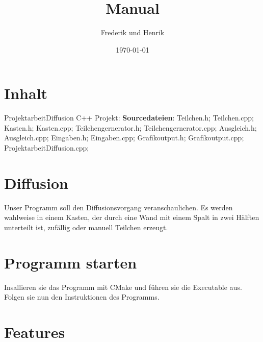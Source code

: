 \documentclass[14pt,a4paper]{scrartcl}
\title{Manual}
\author{Frederik und Henrik}
\date{\today}
\begin{document}
 
\maketitle
\tableofcontents
\section{Inhalt}
ProjektarbeitDiffusion C++ Projekt:
\newline
\textbf{Sourcedateien}:
Teilchen.h;
Teilchen.cpp;
Kasten.h;
Kasten.cpp;
Teilchengernerator.h;
Teilchengernerator.cpp;
Ausgleich.h;
Ausgleich.cpp;
Eingaben.h;
Eingaben.cpp;
Grafikoutput.h;
Grafikoutput.cpp;
ProjektarbeitDiffusion.cpp;

\section{Diffusion}
Unser Programm soll den Diffusionsvorgang veranschaulichen.
Es werden wahlweise in einem Kasten, der durch eine Wand mit einem Spalt in zwei Hälften unterteilt ist, zufällig oder manuell Teilchen erzeugt.

\section{Programm starten}
Insallieren sie das Programm mit CMake und führen sie die Executable aus.
Folgen sie nun den Instruktionen des Programms.
\section{Features}
  
\end{document}
